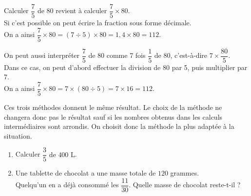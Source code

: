 \begin{Méthode}
Calculer $\dfrac{7}{5}$ de 80 revient à calculer $\dfrac{7}{5} \times 80$.\\
Si c'est possible on peut écrire la fraction sous forme décimale.\\
On a ainsi $\dfrac{7}{5} \times 80 = (7 \div 5) \times 80 = 1,4 \times 80 = 112$.
\end{Méthode}

\begin{Méthode}
On peut aussi interpréter $\dfrac{7}{5}$ de 80 comme 7 fois $ \dfrac{1}{5} $ de 80, c'est-à-dire $7 \times \dfrac{80}{5}$.\\
Dans ce cas, on peut d'abord effectuer la division de 80 par 5, puis multiplier par 7.\\
On a ainsi $\dfrac{7}{5} \times 80 = 7 \times (80 \div 5) = 7 \times 16 = 112$.
\end{Méthode}



\begin{Remarque}
Ces trois méthodes donnent le même résultat. Le choix de la méthode ne changera donc pas le résultat sauf si les nombres obtenus dans les calculs intermédiaires sont arrondis. On choisit donc la méthode la plus adaptée à la situation.
\end{Remarque}

\begin{Exemples}
\begin{enumerate}
\item Calculer $\dfrac{3}{5} \text{ de } 400 \text{ L}$. 

\ligne

\ligne

\ligne

\ligne

\item Une tablette de chocolat a une masse totale de $120$ grammes. \\
Quelqu'un en a déjà consommé les $\dfrac{11}{30}$. Quelle masse de chocolat reste-t-il ?\\

\ligne

\ligne

\ligne

\ligne

\ligne

\ligne

\ligne

\ligne
\end{enumerate}
\end{Exemples}